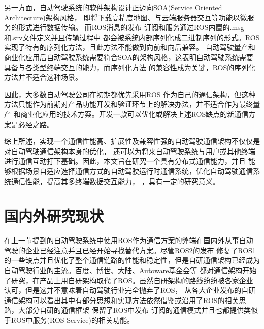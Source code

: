 另一方面，自动驾驶系统的软件架构设计正迈向SOA(Service Oriented Architecture)架构风格，
即将下载高精度地图、与云端服务器交互等功能以微服务的形式进行数据传输。
而ROS消息的发布-订阅和服务通过ROS内置的.msg和.srv文件定义并且传输过程中
都会被系统内部序列化成二进制序列的形式。ROS实现了特有的序列化方法，且此方法不能做到向前和向后兼容。
自动驾驶量产和商业化应用后自动驾驶系统需要符合SOA的架构风格，这表明自动驾驶系统需要具备与各类型终端交互的能力，而序列化方法
的兼容性成为关键，ROS的序列化方法并不适合这种场景。

因此，大多数自动驾驶公司在初期都优先采用ROS
作为自己的通信架构，但这种方法只能作为前期对产品功能开发和验证环节上的解决办法，并不适合作为最终量产
和商业化应用的技术方案。开发一款可以优化或解决上述ROS缺点的新通信方案是必经之路\cite{xml}。

综上所述，实现一个通信性能高、扩展性及兼容性强的自动驾驶通信架构不仅仅是对自动驾驶通信架构本身的优化，
还可以为将来自动驾驶系统与用户或其他终端进行通信互动打下基础。因此，本文旨在研究一个具有分布式通信能力，并且
能够根据场景自适应选择通信方式的自动驾驶运行时通信系统，优化自动驾驶通信系统通信性能，提高其多终端数据交互能力，
，具有一定的研究意义。

\section{国内外研究现状}
在上一节提到的自动驾驶系统中使用ROS作为通信方案的弊端在国内外从事自动驾驶的企业已经注意并且已经开始寻找替代方案。尽管ROS2的发布
修复了ROS1的一些缺点并且优化了整个通信链路的性能和稳定性，但是自研通信架构已经成为自动驾驶行业的主流。百度、博世、大陆、Autoware基金会等
都对通信架构开始了研究，在产品上用自研架构取代了ROS。虽然自研架构的路线纷纷被各家企业认可，但是这并不意味着自动驾驶行业完全抛弃了ROS，
从各大企业发布的自研通信架构可以看出其中有部分思想和实现方法依然借鉴或沿用了ROS的相关思路，大部分自研的通信框架
保留了ROS中发布-订阅的通信模式并且也都提供类似于ROS中服务(ROS Service)的相关功能。
